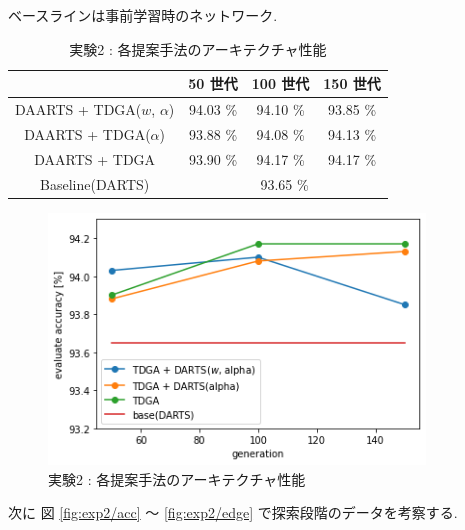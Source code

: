\begin{table}[t]
  \begin{center}
    \caption{実験2 : 各提案手法のアーキテクチャ性能}
		\vspace{-1mm}
    ベースラインは事前学習時のネットワーク.
		\vspace{1mm}
		\vspace{3mm}
    \begin{tabular}{|c|c|c|c|} \hline
    \textbf{}       & \textbf{50 世代} & \textbf{100 世代} & \textbf{150 世代} \\ \hline\hline
    DAARTS + TDGA($w$, $\alpha$)& 94.03 \%       & 94.10 \%        & 93.85 \%        \\ \hline
    DAARTS + TDGA($\alpha$)& 93.88 \%       & 94.08 \%        & 94.13 \%        \\ \hline
    DAARTS + TDGA   & 93.90 \%       & 94.17 \%        & 94.17 \%        \\ \hline
    Baseline(DARTS) & \multicolumn{3}{c|}{93.65 \%}                      \\ \hline
    \end{tabular}
    \label{tab:acc_ga}
  \end{center}
\end{table}

\begin{figure}[t]
  \begin{center}
    \includegraphics[clip,width=10cm]{./fig/04.exp/eval.png}
  \end{center}
  \caption{実験2 : 各提案手法のアーキテクチャ性能}
  \label{fig:exp2/eval}
\end{figure}


次に 図 \ref{fig:exp2/acc} ～ \ref{fig:exp2/edge} で探索段階のデータを考察する.

